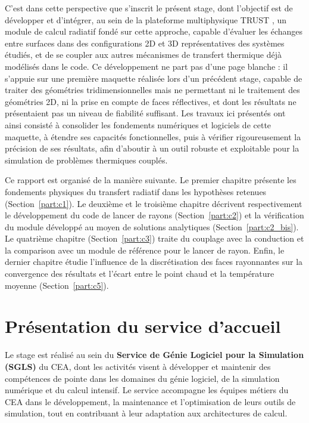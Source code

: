 C'est dans cette perspective que s'inscrit le présent stage, dont l'objectif est de développer et d'intégrer, au sein de la plateforme multiphysique TRUST \cite{saikali2025trust}, un module de calcul radiatif fondé sur cette approche, capable d'évaluer les échanges entre surfaces dans des configurations 2D et 3D représentatives des systèmes étudiés, et de se coupler aux autres mécanismes de transfert thermique déjà modélisés dans le code. Ce développement ne part pas d'une page blanche : il s'appuie sur une première maquette réalisée lors d'un précédent stage, capable de traiter des géométries tridimensionnelles mais ne permettant ni le traitement des géométries 2D, ni la prise en compte de faces réflectives, et dont les résultats ne présentaient pas un niveau de fiabilité suffisant. Les travaux ici présentés ont ainsi consisté à consolider les fondements numériques et logiciels de cette maquette, à étendre ses capacités fonctionnelles, puis à vérifier rigoureusement la précision de ses résultats, afin d'aboutir à un outil robuste et exploitable pour la simulation de problèmes thermiques couplés.
 
Ce rapport est organisé de la manière suivante. Le premier chapitre présente les fondements physiques du transfert radiatif dans les hypothèses retenues (Section~\ref{part:c1}). Le deuxième  et le troisième chapitre décrivent respectivement le développement du code de lancer de rayons (Section~\ref{part:c2}) et la vérification du module développé au moyen de solutions analytiques (Section~\ref{part:c2_bis}). Le quatrième chapitre (Section~\ref{part:c3}) traite du couplage avec la conduction et la comparison avec \pcr  un module de référence pour le lancer de rayon. Enfin, le dernier chapitre étudie l'influence de la discrétisation des faces rayonnantes sur la convergence des résultats et l'écart entre le point chaud et la température moyenne (Section~\ref{part:c5}).



\section{Présentation du service d'accueil}

Le stage est réalisé au sein du \textbf{Service de Génie Logiciel pour la Simulation (SGLS)} du CEA, dont les activités visent à développer
et maintenir des compétences de pointe dans les domaines du génie
logiciel, de la simulation numérique et du calcul intensif. Le service
accompagne les équipes métiers du CEA dans le développement, la
maintenance et l'optimisation de leurs outils de simulation, tout en
contribuant à leur adaptation aux architectures de calcul.

